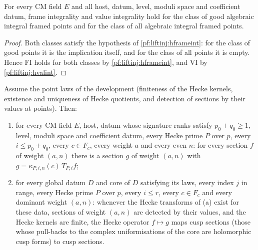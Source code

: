 \begin{proposition}\label{pf:liftinj:hint}
For every CM field $E$ and all host, datum, level, moduli space and coefficient datum, frame integrality and value integrality hold for the class of
good algebraic integral framed points and for the class of all algebraic integral framed points.
\end{proposition}

\begin{proof}
Both classes satisfy the hypothesis of \cref{pf:liftinj:hframeint}: for the class of good points it is the implication itself, and for the class of
all points it is empty. Hence $\mathrm{FI}$ holds for both classes by \cref{pf:liftinj:hframeint}, and $\mathrm{VI}$ by \cref{pf:liftinj:hvalint}.
\end{proof}

\begin{proposition}\label{pf:liftinj:htr}
Assume the point laws of the development (finiteness of the Hecke kernels, existence and uniqueness of Hecke quotients, and detection of sections by
their values at points). Then:
\begin{enumerate}[label=(\alph*)]
\item for every CM field $E$, host, datum whose signature ranks satisfy $p_0+q_0\ge1$, level, moduli space and coefficient datum, every Hecke prime $P$
over $p$, every $i\le p_0+q_0$, every $c\in F_c$, every weight $a$ and every even $n$: for every section $f$ of weight $(a,n)$ there is a section $g$ of
weight $(a,n)$ with $g=\kappa_{P,i,n}(c)\,T_{P,i}f$;
\item for every global datum $D$ and core of $D$ satisfying its laws, every index $j$ in range, every Hecke prime $P$ over $p$, every $i\le r$, every
$c\in F_c$ and every dominant weight $(a,n)$: whenever the Hecke transforms of (a) exist for these data, sections of weight $(a,n)$ are detected by
their values, and the Hecke kernels are finite, the Hecke operator $f\mapsto g$ maps cusp sections (those whose pull-backs to the complex
uniformisations of the core are holomorphic cusp forms) to cusp sections.
\end{enumerate}
\end{proposition}

